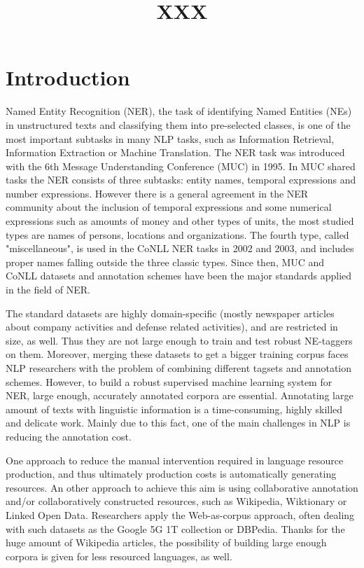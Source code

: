 \documentclass[11pt]{article}
\title{XXX}
\date{}
\begin{document}
\maketitle
\begin{abstract}
  
\end{abstract}

\section{Introduction}

Named Entity Recognition (NER), the task of identifying Named Entities (NEs) in unstructured texts and classifying them into pre-selected classes, is one of the most important subtasks in many NLP tasks, such as Information Retrieval, Information Extraction or Machine Translation. The NER task was introduced with the 6th Message Understanding Conference (MUC) in 1995. In MUC shared tasks the NER consists of three subtasks: entity names, temporal expressions and number expressions. However there is a general agreement in the NER community about the inclusion of temporal expressions and some numerical expressions such as amounts of money and other types of units, the most studied types are names of persons, locations and organizations. The fourth type, called "miscellaneous", is used in the CoNLL NER tasks in 2002 and 2003, and includes proper names falling outside the three classic types. Since then, MUC and CoNLL datasets and annotation schemes have been the major standards applied in the field of NER.    

The standard datasets are highly domain-specific (mostly newspaper articles about company activities and defense related activities), and are restricted in size, as well. Thus they are not large enough to train and test robust NE-taggers on them. Moreover, merging these datasets to get a bigger training corpus faces NLP researchers with the problem of combining different tagsets and annotation schemes. However, to build a robust supervised machine learning system for NER, large enough, accurately annotated corpora are essential. Annotating large amount of texts with linguistic information is a time-consuming, highly skilled and delicate work. Mainly due to this fact, one of the main challenges in NLP is reducing the annotation cost. 

One approach to reduce the manual intervention required in language resource production, and thus ultimately production costs is automatically generating resources. An other approach to achieve this aim is using collaborative annotation and/or collaboratively constructed resources, such as Wikipedia, Wiktionary or Linked Open Data. Researchers apply the Web-as-corpus approach, often dealing with such datasets as the Google 5G 1T collection or DBPedia. Thanks for the huge amount of Wikipedia articles, the possibility of building large enough corpora is given for less resourced languages, as well.  
\end{document}
